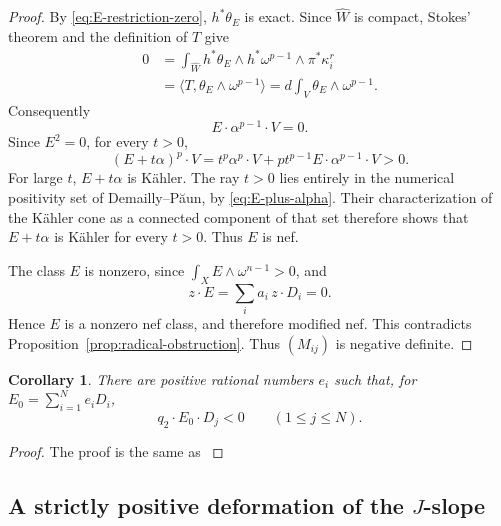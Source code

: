\documentclass[reqno]{amsart}
\theoremstyle{plain}
\newtheorem{corollary}[thm]{Corollary}
\theoremstyle{remark}
\begin{document}
\begin{proof}
By \eqref{eq:E-restriction-zero}, $h^*\theta_E$ is exact. Since
$\widehat W$ is compact, Stokes' theorem and the definition of $T$
give
\begin{align*}
0
&=\int_{\widehat W}
 h^*\theta_E\wedge h^*\omega^{p-1}\wedge
 \pi^*\kappa_i^r\\
&=\langle T,\theta_E\wedge\omega^{p-1}\rangle
 =d\int_V\theta_E\wedge\omega^{p-1}.
\end{align*}
Consequently
\[
 E\cdot\alpha^{p-1}\cdot V=0.
\]
Since $E^2=0$, for every $t>0$,
\begin{equation}\label{eq:E-plus-alpha}
 (E+t\alpha)^p\cdot V
 =
 t^p\alpha^p\cdot V
 +pt^{p-1}E\cdot\alpha^{p-1}\cdot V>0.
\end{equation}
For large $t$, $E+t\alpha$ is K\"ahler.  The ray $t>0$ lies
entirely in the numerical positivity set of Demailly--P\u{a}un, by
\eqref{eq:E-plus-alpha}.  Their characterization of the K\"ahler cone
as a connected component of that set
\cite[Theorem~0.1]{DP04} therefore shows that
$E+t\alpha$ is K\"ahler for every $t>0$.  Thus $E$ is nef.

The class $E$ is nonzero, since
$\int_X E\wedge\omega^{n-1}>0$, and
\[
 z\cdot E=\sum_i a_i\,z\cdot D_i=0.
\]
Hence $E$ is a nonzero nef class, and therefore modified nef. This
contradicts Proposition~\ref{prop:radical-obstruction}. Thus
$(M_{ij})$ is negative definite.





\end{proof}
\begin{corollary}
    \label{cor:inward}
There are positive rational numbers $e_i$ such that, for
$E_0=\sum_{i=1}^N e_iD_i$,
\begin{equation}\label{eq:inward}
 q_2\cdot E_0\cdot D_j<0\qquad(1\leq j\leq N).
\end{equation}
\end{corollary}
\begin{proof}
The proof is the same as \cite[Corollary 13]{3d}
\end{proof}

\subsection{A strictly positive deformation of the
\texorpdfstring{$J$}{J}-slope}
\end{document}
